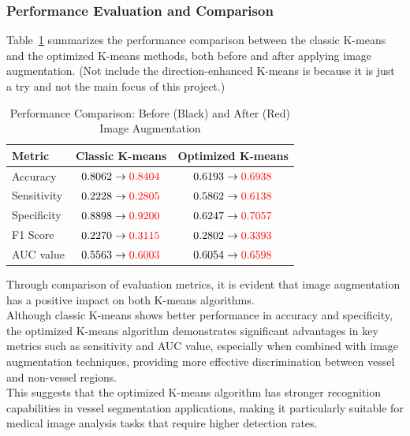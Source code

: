 \documentclass[final]{article}
\begin{document}
\subsubsection{Performance Evaluation and Comparison}
Table~\ref{tab:performance} summarizes the performance comparison between the classic K-means and the optimized K-means methods, both before and after applying image augmentation. (Not include the direction-enhanced K-means is because it is just a try and not the main focus of this project.) 
\begin{table}[H]
    \centering
    \caption{Performance Comparison: Before (Black) and After (Red) Image Augmentation}
    \label{tab:performance}
    \begin{tabular}{lcc}
    \toprule
    \textbf{Metric} & \textbf{Classic K-means} & \textbf{Optimized K-means} \\
    \midrule
    Accuracy & $0.8062 \rightarrow \textcolor{red}{0.8404}$ & $0.6193 \rightarrow \textcolor{red}{0.6938}$ \\
    Sensitivity & $0.2228 \rightarrow \textcolor{red}{0.2805}$ & $0.5862 \rightarrow \textcolor{red}{0.6138}$ \\
    Specificity & $0.8898 \rightarrow \textcolor{red}{0.9200}$ & $0.6247 \rightarrow \textcolor{red}{0.7057}$ \\
    F1 Score   & $0.2270 \rightarrow \textcolor{red}{0.3115}$ & $0.2802 \rightarrow \textcolor{red}{0.3393}$ \\
    AUC value    & $0.5563 \rightarrow \textcolor{red}{0.6003}$ & $0.6054 \rightarrow \textcolor{red}{0.6598}$ \\
    \bottomrule
    \end{tabular}
\end{table}





Through comparison of evaluation metrics, it is evident that image augmentation has a positive impact on both K-means algorithms. \\
Although classic K-means shows better performance in accuracy and specificity, the optimized K-means algorithm demonstrates significant advantages in key metrics such as sensitivity and AUC value, especially when combined with image augmentation techniques, providing more effective discrimination between vessel and non-vessel regions. \\
This suggests that the optimized K-means algorithm has stronger recognition capabilities in vessel segmentation applications, making it particularly suitable for medical image analysis tasks that require higher detection rates.
\end{document}
